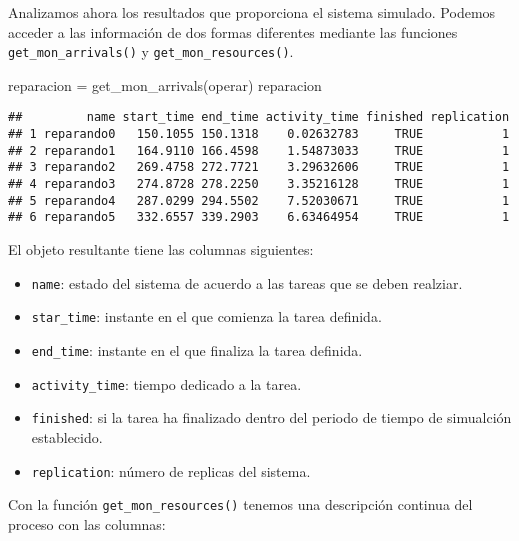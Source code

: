 \documentclass[
]{book}
\newenvironment{Shaded}{\begin{snugshade}}{\end{snugshade}}
\newcommand{\FunctionTok}[1]{\textcolor[rgb]{0.00,0.00,0.00}{#1}}
\newcommand{\NormalTok}[1]{#1}
\newcommand{\OtherTok}[1]{\textcolor[rgb]{0.56,0.35,0.01}{#1}}
\providecommand{\tightlist}{%
  \setlength{\itemsep}{0pt}\setlength{\parskip}{0pt}}
\theoremstyle{definition}
\theoremstyle{definition}
\theoremstyle{definition}
\theoremstyle{definition}
\theoremstyle{remark}
\begin{document}
Analizamos ahora los resultados que proporciona el sistema simulado. Podemos acceder a las información de dos formas diferentes mediante las funciones \texttt{get\_mon\_arrivals()} y \texttt{get\_mon\_resources()}.

\begin{Shaded}
\begin{Highlighting}[]
\NormalTok{reparacion }\OtherTok{=} \FunctionTok{get\_mon\_arrivals}\NormalTok{(operar)}
\NormalTok{reparacion}
\end{Highlighting}
\end{Shaded}

\begin{verbatim}
##         name start_time end_time activity_time finished replication
## 1 reparando0   150.1055 150.1318    0.02632783     TRUE           1
## 2 reparando1   164.9110 166.4598    1.54873033     TRUE           1
## 3 reparando2   269.4758 272.7721    3.29632606     TRUE           1
## 4 reparando3   274.8728 278.2250    3.35216128     TRUE           1
## 5 reparando4   287.0299 294.5502    7.52030671     TRUE           1
## 6 reparando5   332.6557 339.2903    6.63464954     TRUE           1
\end{verbatim}

El objeto resultante tiene las columnas siguientes:

\begin{itemize}
\tightlist
\item
  \texttt{name}: estado del sistema de acuerdo a las tareas que se deben realziar.
\item
  \texttt{star\_time}: instante en el que comienza la tarea definida.
\item
  \texttt{end\_time}: instante en el que finaliza la tarea definida.
\item
  \texttt{activity\_time}: tiempo dedicado a la tarea.
\item
  \texttt{finished}: si la tarea ha finalizado dentro del periodo de tiempo de simualción establecido.
\item
  \texttt{replication}: número de replicas del sistema.
\end{itemize}

Con la función \texttt{get\_mon\_resources()} tenemos una descripción continua del proceso con las columnas:
\end{document}
